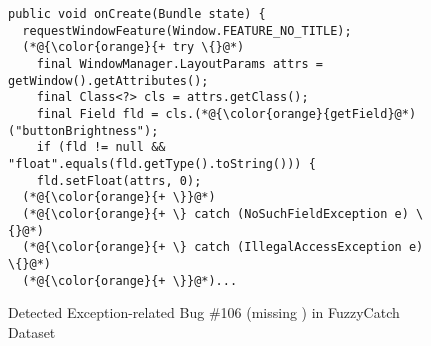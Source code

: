 \begin{figure}[t]%
	\centering
\begin{lstlisting}[]
public void onCreate(Bundle state) {
  requestWindowFeature(Window.FEATURE_NO_TITLE);
  (*@{\color{orange}{+ try \{}@*)
    final WindowManager.LayoutParams attrs = getWindow().getAttributes();
    final Class<?> cls = attrs.getClass();
    final Field fld = cls.(*@{\color{orange}{getField}@*)("buttonBrightness");
    if (fld != null && "float".equals(fld.getType().toString())) {
    fld.setFloat(attrs, 0);
  (*@{\color{orange}{+ \}}@*)
  (*@{\color{orange}{+ \} catch (NoSuchFieldException e) \{}@*)
  (*@{\color{orange}{+ \} catch (IllegalAccessException e) \{}@*)
  (*@{\color{orange}{+ \}}@*)...
\end{lstlisting}
        \vspace{-16pt}
        \caption{{\tool} Detected Exception-related Bug \#106 (missing ) in FuzzyCatch Dataset}
        \label{fig:example-bug}
\end{figure}
